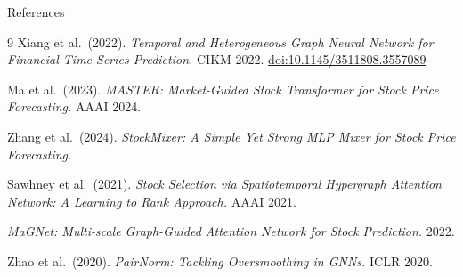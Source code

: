 \documentclass[aspectratio=169, 10pt]{beamer}
\begin{document}
\appendix

\begin{frame}{References}
  \begin{thebibliography}{9}
      Xiang et al.\ (2022).
      \textit{Temporal and Heterogeneous Graph Neural Network for Financial
      Time Series Prediction.}
      CIKM 2022.
      \href{https://doi.org/10.1145/3511808.3557089}{doi:10.1145/3511808.3557089}

      Ma et al.\ (2023).
      \textit{MASTER: Market-Guided Stock Transformer for Stock Price
      Forecasting.}
      AAAI 2024.

      Zhang et al.\ (2024).
      \textit{StockMixer: A Simple Yet Strong MLP Mixer for Stock
      Price Forecasting.}

      Sawhney et al.\ (2021).
      \textit{Stock Selection via Spatiotemporal Hypergraph Attention Network:
      A Learning to Rank Approach.}
      AAAI 2021.

      \textit{MaGNet: Multi-scale Graph-Guided Attention Network for Stock
      Prediction.}
      2022.

      Zhao et al.\ (2020).
      \textit{PairNorm: Tackling Oversmoothing in GNNs.}
      ICLR 2020.
  \end{thebibliography}
\end{frame}
\end{document}
